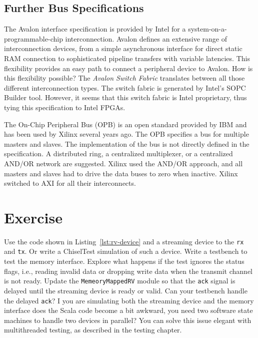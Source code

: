 \documentclass[%
    10pt,
    headinclude, footexclude,
    openright, %
    notitlepage,
    cleardoubleempty,
    headsepline,
    pointlessnumbers,
    bibtotoc, idxtotoc,
    ]{scrbook}
\newcommand{\code}[1]{{\lstinline[basicstyle=\small\ttfamily]{#1}}}
\newcommand{\todo}[1]{{\emph{TODO: #1}}}
\renewcommand{\todo}[1]{}
\begin{document}
\todo{Copy some code from Patmos for an example.}

\subsection{Further Bus Specifications}

The Avalon \cite{soc:avalon} interface specification is provided by
Intel for a system-\-on-a\--pro\-grammable-\-chip interconnection.
Avalon defines an extensive range of interconnection devices, from
a simple asynchronous interface for direct static RAM
connection to sophisticated pipeline transfers with variable
latencies. This flexibility provides an easy path to connect a
peripheral device to Avalon. How is this flexibility possible? The
\emph{Avalon Switch Fabric} translates between all those different
interconnection types. The switch fabric is generated by Intel's
SOPC Builder tool. However, it seems that this switch fabric is
Intel proprietary, thus tying this specification to Intel FPGAs.

The On-Chip Peripheral Bus (OPB) \cite{soc:opb} is an open standard
provided by IBM and has been used by Xilinx several years ago.
The OPB specifies a bus for
multiple masters and slaves. The implementation of the bus is not
directly defined in the specification. A distributed ring, a
centralized multiplexer, or a centralized AND/OR network are
suggested. Xilinx used the AND/OR approach, and all masters and
slaves had to drive the data buses to zero when inactive.
Xilinx switched to AXI for all their interconnects.

\section{Exercise}

Use the code shown in Listing~\ref{lst:rv-device} and a streaming device to the \code{rx}
and \code{tx}. Or write a ChiselTest simulation of such a device. Write a testbench
to test the memory interface. Explore what happens if the test ignores the status flags,
i.e., reading invalid data or dropping write data when the transmit channel is not ready.
Update the \code{MemeoryMappedRV} module so that the \code{ack} signal is delayed until
the streaming device is ready or valid. Can your testbench handle the delayed \code{ack}?
I you are simulating both the streaming device and the memory interface does the Scala
code become a bit awkward, you need two software state machines to handle
two devices in parallel? You can solve this issue elegant with multithreaded testing,
as described in the testing chapter.
\end{document}
